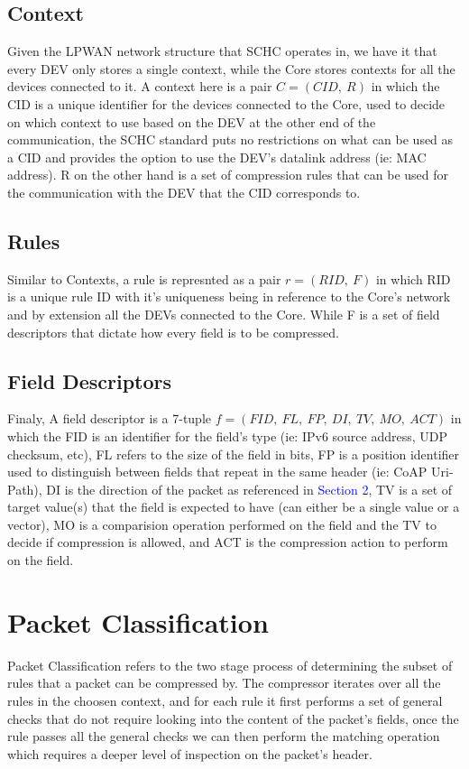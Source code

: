 \documentclass[12pt]{dalthesis}
\begin{document}
	\subsection{Context}
	Given the LPWAN network structure that SCHC operates in, we have it that every DEV only stores a single context, while the Core stores contexts
	for all the devices connected to it. A context here is a pair $C = (CID, \ R)$ in which the CID is a unique identifier for the 
	devices connected to the Core, used to decide on which context to use based on the DEV at the other end of the communication, the SCHC standard 
	puts no restrictions on what can be used as a CID and provides the option to use the DEV's datalink address (ie: MAC address). R on the other hand
	is a set of compression rules that can be used for the communication with the DEV that the CID corresponds to. 

	\subsection{Rules}
	Similar to Contexts, a rule is represnted as a pair $r = (RID, \ F)$ in which RID is a unique rule ID with it's uniqueness being
	in reference to the Core's network and by extension all the DEVs connected to the Core. While F is a set of field descriptors that dictate how
	every field is to be compressed.

	\subsection{Field Descriptors}
	Finaly, A field descriptor is a 7-tuple $f= (FID, \ FL, \ FP, \ DI, \ TV, \ MO, \ ACT)$ in which the FID is an identifier for the 
	field's type (ie: IPv6 source address, UDP checksum, etc), FL refers to the size of the field in bits, FP is a position identifier used to
	distinguish between fields that repeat in the same header (ie: CoAP Uri-Path), DI is the direction of the packet as referenced in 
	\textcolor{blue}{Section 2}, TV is a set of target value(s) that the field is expected to have (can either be a single value or a vector), MO is a comparision operation performed
	on the field and the TV to decide if compression is allowed, and ACT is the compression action to perform on the field.


	\vspace{3em}
	\section{Packet Classification}
	Packet Classification refers to the two stage process of determining the subset of rules that a packet can be compressed by. The compressor
	iterates over all the rules in the choosen context, and for each rule it 
	first performs a set of general checks that do not require looking into the content of the packet's fields, once the rule passes all
	the general checks we can then perform the matching operation which requires a deeper level of inspection on the packet's header.	
\end{document}
